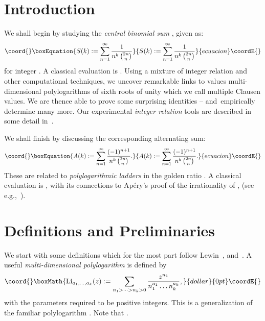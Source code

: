 \documentclass[a4paper,a4paper]{article}
\providecommand{\li}{\operatorname{Li}}
\begin{document}
\section{Introduction}

We shall begin by studying the {\em central binomial sum} \coordHE{}, given as:
\begin{equation}\coord{}\boxEquation{
\label{eq:bin}
S(k) := \sum_{n=1}^\infty \frac{1}{n^k \,{2n \choose n}}
}{
S(k) := \sum_{n=1}^\infty \frac{1}{n^k \,{2n \choose n}}
}{ecuacion}\coordE{}\end{equation}
for integer \coordHE{}.
A classical evaluation is \coordHE{}.  Using a
mixture of integer relation and other computational techniques, we
uncover remarkable links to values multi-dimensional polylogarithms of
sixth roots of unity which we call multiple Clausen values.  We are thence
able to prove some surprising identities -- and\ empirically determine
many more. Our experimental {\em integer relation} tools are
described in some detail in~\cite{BL}.

 We shall finish by discussing the corresponding
alternating sum:
\begin{equation}\coord{}\boxEquation{
\label{eq:alt}
A(k):=\sum_{n=1}^\infty \frac{(-1)^{n+1}}
{n^k\,{{2n}\choose n}}.
}{
A(k):=\sum_{n=1}^\infty \frac{(-1)^{n+1}}
{n^k\,{{2n}\choose n}}.
}{ecuacion}\coordE{}\end{equation}
These are related to {\em polylogarithmic
ladders} in the {golden ratio} \coordHE{}.  A classical
evaluation is \coordHE{}, with its connections to
Ap\'ery's proof of the irrationality of \coordHE{}, (see e.g.,~\cite{PA}).


\section{Definitions and Preliminaries}

We start with some definitions which for the most part follow Lewin~\cite{L},
and~\cite{BBB,BBBLC,BBBL}.
A useful {\em multi-dimensional polylogarithm} is defined by
$$\coord{}\boxMath{ \li_{a_1, \dots , a_k} (z) :=
\sum_{n_1 > \dots > n_k > 0} \frac{z^{n_1}}{n_1^{a_1} \ldots n_k^{a_k}}, }{dollar}{0pt}\coordE{}$$
with the parameters required to be positive integers.
  This is a generalization of the familiar polylogarithm
   \myHighlight{$ \li_n(z) := \sum_{k=1}^\infty z^k/k^n $}\coordHE{}.
Note that \myHighlight{$ \li_n(1) = \zeta(n) $}\coordHE{}.
\end{document}
